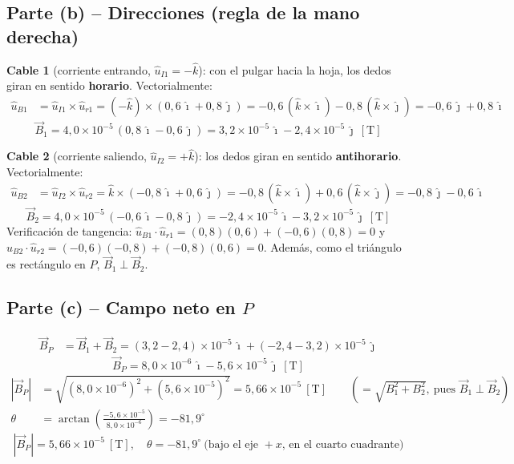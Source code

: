 \documentclass[12pt,letterpaper]{article}
\begin{document}
\subsection*{Parte (b) -- Direcciones (regla de la mano derecha)}

\noindent\textbf{Cable 1} (corriente entrando, $\hat{u}_{I1} = -\hat{k}$): con el pulgar hacia la hoja,
los dedos giran en sentido \textbf{horario}. Vectorialmente:
\begin{align*}
    \hat{u}_{B1} &= \hat{u}_{I1}\times\hat{u}_{r1} = (-\hat{k})\times(0{,}6\,\hat{\imath} + 0{,}8\,\hat{\jmath})
    = -0{,}6\,(\hat{k}\times\hat{\imath}) - 0{,}8\,(\hat{k}\times\hat{\jmath})
    = -0{,}6\,\hat{\jmath} + 0{,}8\,\hat{\imath}
\end{align*}
\[
    \boxed{\vec{B}_1 = 4{,}0\times10^{-5}\,(0{,}8\,\hat{\imath} - 0{,}6\,\hat{\jmath})
    = 3{,}2\times10^{-5}\,\hat{\imath} - 2{,}4\times10^{-5}\,\hat{\jmath}\ [\text{T}]}
\]

\noindent\textbf{Cable 2} (corriente saliendo, $\hat{u}_{I2} = +\hat{k}$): los dedos giran en sentido
\textbf{antihorario}. Vectorialmente:
\begin{align*}
    \hat{u}_{B2} &= \hat{u}_{I2}\times\hat{u}_{r2} = \hat{k}\times(-0{,}8\,\hat{\imath} + 0{,}6\,\hat{\jmath})
    = -0{,}8\,(\hat{k}\times\hat{\imath}) + 0{,}6\,(\hat{k}\times\hat{\jmath})
    = -0{,}8\,\hat{\jmath} - 0{,}6\,\hat{\imath}
\end{align*}
\[
    \boxed{\vec{B}_2 = 4{,}0\times10^{-5}\,(-0{,}6\,\hat{\imath} - 0{,}8\,\hat{\jmath})
    = -2{,}4\times10^{-5}\,\hat{\imath} - 3{,}2\times10^{-5}\,\hat{\jmath}\ [\text{T}]}
\]
\noindent Verificaci\'on de tangencia: $\hat{u}_{B1}\cdot\hat{u}_{r1} = (0{,}8)(0{,}6) + (-0{,}6)(0{,}8) = 0$
y $\hat{u}_{B2}\cdot\hat{u}_{r2} = (-0{,}6)(-0{,}8) + (-0{,}8)(0{,}6) = 0$. Adem\'as, como el
tri\'angulo es rect\'angulo en $P$, $\vec{B}_1\perp\vec{B}_2$.

\subsection*{Parte (c) -- Campo neto en $P$}
\begin{align*}
    \vec{B}_P &= \vec{B}_1 + \vec{B}_2
    = (3{,}2 - 2{,}4)\times10^{-5}\,\hat{\imath} + (-2{,}4 - 3{,}2)\times10^{-5}\,\hat{\jmath}
\end{align*}
\[
    \boxed{\vec{B}_P = 8{,}0\times10^{-6}\,\hat{\imath} - 5{,}6\times10^{-5}\,\hat{\jmath}\ [\text{T}]}
\]
\begin{align*}
    |\vec{B}_P| &= \sqrt{(8{,}0\times10^{-6})^2 + (5{,}6\times10^{-5})^2}
    = 5{,}66\times10^{-5}\ [\text{T}]
    \qquad\left(=\sqrt{B_1^2 + B_2^2},\ \text{pues } \vec{B}_1\perp\vec{B}_2\right)\\[4pt]
    \theta &= \arctan\!\left(\frac{-5{,}6\times10^{-5}}{8{,}0\times10^{-6}}\right) = -81{,}9^\circ
\end{align*}
\[
    \boxed{|\vec{B}_P| = 5{,}66\times10^{-5}\ [\text{T}],\quad \theta = -81{,}9^\circ
    \ \text{(bajo el eje } +x\text{, en el cuarto cuadrante)}}
\]
\end{document}
